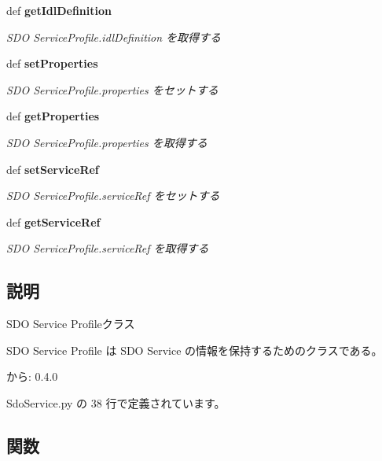 \begin{CompactItemize}
def {\bf getIdlDefinition}
\begin{CompactList}\small\item\em SDO ServiceProfile.idlDefinition を取得する \item\end{CompactList}\item 
def {\bf setProperties}
\begin{CompactList}\small\item\em SDO ServiceProfile.properties をセットする \item\end{CompactList}\item 
def {\bf getProperties}
\begin{CompactList}\small\item\em SDO ServiceProfile.properties を取得する \item\end{CompactList}\item 
def {\bf setServiceRef}
\begin{CompactList}\small\item\em SDO ServiceProfile.serviceRef をセットする \item\end{CompactList}\item 
def {\bf getServiceRef}
\begin{CompactList}\small\item\em SDO ServiceProfile.serviceRef を取得する \item\end{CompactList}\end{CompactItemize}


\subsection{説明}
SDO Service Profileクラス 

SDO Service Profile は SDO Service の情報を保持するためのクラスである。

\begin{Desc}
\item[から:]0.4.0 \end{Desc}


 SdoService.py の 38 行で定義されています。

\subsection{関数}
